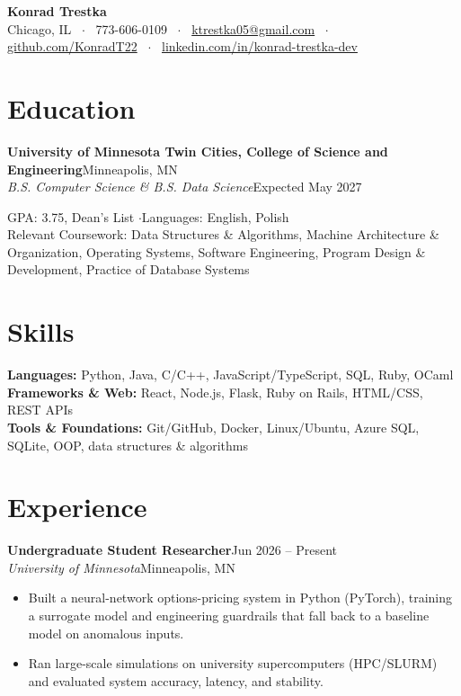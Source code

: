 \documentclass[letterpaper,10.5pt]{article}
\newcommand{\entry}[4]{\textbf{#1}\hfill{\small #2}\\\textit{\small #3}\hfill{\small #4}\par\vspace{1pt}}
\begin{document}
{\centering
{\LARGE\bfseries Konrad Trestka}\\[3pt]
{\small Chicago, IL ~$\cdot$~ 773-606-0109 ~$\cdot$~ \href{mailto:ktrestka05@gmail.com}{ktrestka05@gmail.com} ~$\cdot$~ \href{https://github.com/KonradT22}{github.com/KonradT22} ~$\cdot$~ \href{https://www.linkedin.com/in/konrad-trestka-dev}{linkedin.com/in/konrad-trestka-dev}}\par}
\vspace{2pt}

\section{Education}
\entry{University of Minnesota Twin Cities, College of Science and Engineering}{Minneapolis, MN}{B.S. Computer Science \& B.S. Data Science}{Expected May 2027}
{\small GPA: 3.75, Dean's List \quad$\cdot$\quad Languages: English, Polish \\
Relevant Coursework: Data Structures \& Algorithms, Machine Architecture \& Organization, Operating Systems, Software Engineering, Program Design \& Development, Practice of Database Systems}

\section{Skills}
{\small \textbf{Languages:} Python, Java, C/C++, JavaScript/TypeScript, SQL, Ruby, OCaml \\
\textbf{Frameworks \& Web:} React, Node.js, Flask, Ruby on Rails, HTML/CSS, REST APIs \\
\textbf{Tools \& Foundations:} Git/GitHub, Docker, Linux/Ubuntu, Azure SQL, SQLite, OOP, data structures \& algorithms}

\section{Experience}
\entry{Undergraduate Student Researcher}{Jun 2026 -- Present}{University of Minnesota}{Minneapolis, MN}
\begin{itemize}
  \item Built a neural-network options-pricing system in Python (PyTorch), training a surrogate model and engineering guardrails that fall back to a baseline model on anomalous inputs.
  \item Ran large-scale simulations on university supercomputers (HPC/SLURM) and evaluated system accuracy, latency, and stability.
\end{itemize}
\end{document}
